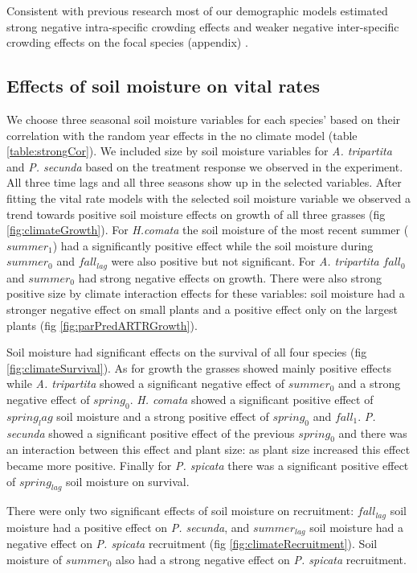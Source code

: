 \documentclass[11pt]{article}
\begin{document}
\begin{doublespace}
Consistent with previous research most of our demographic models estimated strong negative intra-specific crowding effects and weaker negative inter-specific crowding effects on the focal species (appendix) \citep{adler_coexistence_2010,chu_direct_2016,chu_large_2015,adler_weak_2016}.

\subsection*{Effects of soil moisture on vital rates}

We choose three seasonal soil moisture variables for each species' based on their correlation with the random year effects in the no climate model (table \ref{table:strongCor}). We included size by soil moisture variables for \textit{A. tripartita} and  \textit{P. secunda} based on the treatment response we observed in the experiment. All three time lags and all three seasons show up in the selected variables. After fitting the vital rate models with the selected soil moisture variable we observed a trend towards positive soil moisture effects on growth of all three grasses (fig \ref{fig:climateGrowth}). For \textit{H.comata} the soil moisture of the most recent summer ($summer_1$) had a significantly positive effect while the soil moisture during $summer_0$ and $fall_{lag}$ were also positive but not significant. For \textit{A. tripartita} $fall_0$ and $summer_0$ had strong negative effects on growth. There were also strong positive size by climate interaction effects for these variables: soil moisture had a stronger negative effect on small plants and a positive effect only on the largest plants (fig \ref{fig:parPredARTRGrowth}).

Soil moisture had significant effects on the survival of all four species (fig  \ref{fig:climateSurvival}). As for growth the grasses showed mainly positive effects while \textit{A. tripartita} showed a significant negative effect of $summer_0$ and a strong negative effect of $spring_0$. \textit{H. comata} showed a significant positive effect of $spring_lag$ soil moisture and a strong positive effect of $spring_0$ and $fall_1$. \textit{P. secunda} showed a significant positive effect of the previous $spring_0$ and there was an interaction between this effect and plant size: as plant size increased this effect became more positive. Finally for \textit{P. spicata} there was a significant positive effect of $spring_{lag}$ soil moisture on survival.

There were only two significant effects of soil moisture on recruitment: $fall_{lag}$ soil moisture had a positive effect on \textit{P. secunda}, and $summer_{lag}$ soil moisture had a negative effect on \textit{P. spicata} recruitment (fig \ref{fig:climateRecruitment}). Soil moisture of $summer_0$ also had a strong negative effect on \textit{P. spicata} recruitment.  


\end{doublespace}
\end{document}
